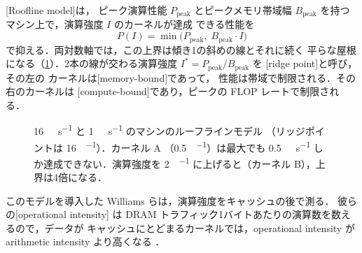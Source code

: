 \documentclass[../main.tex]{subfiles}
\begin{document}
\begin{definition}[ルーフラインモデル]
  \label{def:l08-roofline}
  [Roofline model]は，
  ピーク演算性能 $P_{\text{peak}}$ とピークメモリ帯域幅
  $B_{\text{peak}}$ を持つマシン上で，演算強度 $I$ のカーネルが達成
  できる性能を
  \begin{equation}
    P(I) = \min\bigl(P_{\text{peak}},\; B_{\text{peak}} \cdot I\bigr)
    \label{eq:l08-roofline}
  \end{equation}
  で抑える．両対数軸では，この上界は傾き1の斜めの線とそれに続く
  平らな屋根になる（\cref{fig:l08-roofline}）．2本の線が交わる演算強度
  $I^{*} = P_{\text{peak}}/B_{\text{peak}}$ を
  [ridge point]と呼び，その左の
  カーネルは[memory-bound]であって，
  性能は帯域で制限される．その右のカーネルは
  [compute-bound]であり，ピークの
  FLOP レートで制限される．
\end{definition}

\begin{figure}[tb]
  \centering
  
  \caption{\SI{16}{\tera\flop\per\second} と
    \SI{1}{\tera\byte\per\second} のマシンのルーフラインモデル
    （リッジポイントは \SI{16}{\flop\per\byte}）．カーネル A
    （\SI{0.5}{\flop\per\byte}）は最大でも
    \SI{0.5}{\tera\flop\per\second} しか達成できない．演算強度を
    \SI{2}{\flop\per\byte} に上げると（カーネル B），上界は4倍になる．}
  \label{fig:l08-roofline}
\end{figure}

このモデルを導入した Williams らは，演算強度をキャッシュの後で測る．
彼らの[operational intensity]
は DRAM トラフィック1バイトあたりの演算数を数えるので，データが
キャッシュにとどまるカーネルでは，operational intensity が
arithmetic intensity より高くなる
\cite{williams2009roofline}．
\end{document}

